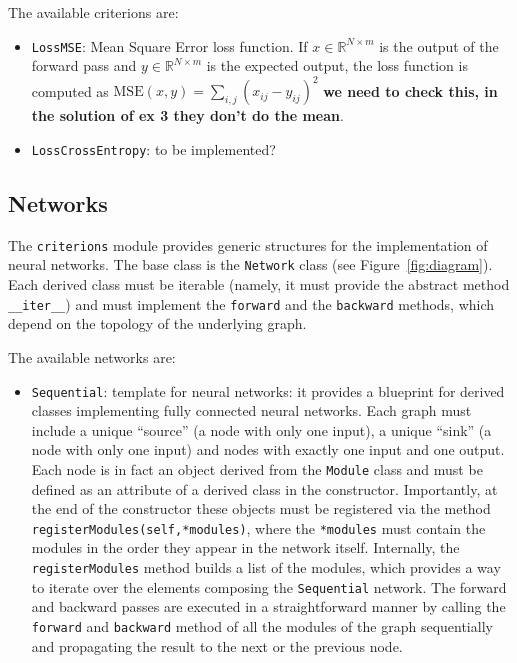 \documentclass[10pt,final,a4paper]{article}
\begin{document}
The available criterions are:
\begin{itemize}
\item \verb|LossMSE|: Mean Square Error loss function. If $x \in \mathbb{R}^{N \times m}$ is the output of the forward pass and $y \in \mathbb{R}^{N \times m}$ is the expected output, the loss function is computed as $\text{MSE}(x,y) = \sum_{i,j} (x_{ij} - y_{ij})^2$ \textbf{we need to check this, in the solution of ex 3 they don't do the mean}.
\item \verb|LossCrossEntropy|: to be implemented?
\end{itemize}

\subsection{Networks}
The \verb|criterions| module provides generic structures for the implementation of neural networks. The base class is the \verb|Network| class (see Figure~\ref{fig:diagram}). Each derived class must be iterable (namely, it must provide the abstract method \verb|__iter__|) and must implement the \verb|forward| and the \verb|backward| methods, which depend on the topology of the underlying graph.

The available networks are:
\begin{itemize}
\item \verb|Sequential|: template for neural networks: it provides a blueprint for derived classes implementing fully connected neural networks. Each graph must include a unique ``source'' (a node with only one input), a unique ``sink'' (a node with only one input) and nodes with exactly one input and one output. Each node is in fact an object derived from the \verb|Module| class and must be defined as an attribute of a derived class in the constructor. Importantly, at the end of the constructor these objects must be registered via the method \verb|registerModules(self,*modules)|, where the \verb|*modules| must contain the modules in the order they appear in the network itself. Internally, the \verb|registerModules| method builds a list of the modules, which  provides a way to iterate over the elements composing the \verb|Sequential| network. The forward and backward passes are executed in a straightforward manner by calling the \verb|forward| and \verb|backward| method of all the modules of the graph sequentially and propagating the result to the next or the previous node.
\end{itemize}
\end{document}
